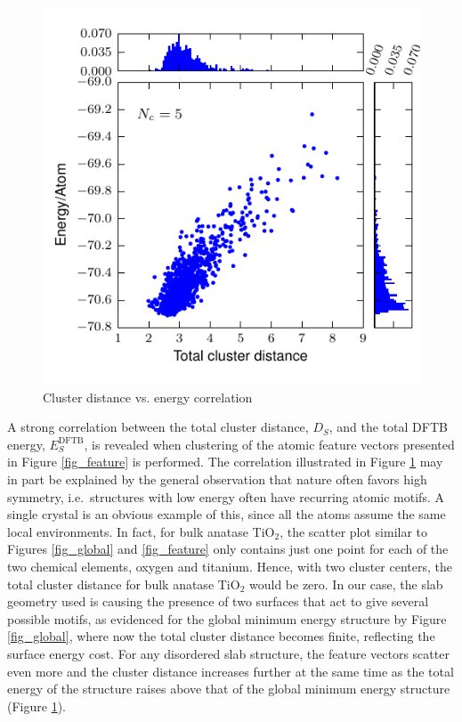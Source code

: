 \documentclass[aip,amsmath,amssymb,reprint]{revtex4-1}
\begin{document}
\begin{figure}[tb]
    \centering
    \includegraphics[width=1.0\columnwidth]{fig4-correlation.pdf}
    \caption{Cluster distance vs. energy correlation}
    \label{fig_corr}
\end{figure}

A strong correlation between the total
cluster distance, $D_S$, and the total DFTB energy,
$E_S^\mathrm{DFTB}$, is revealed when
clustering of the atomic feature vectors presented in
Figure \ref{fig_feature} is performed. The correlation illustrated in
Figure \ref{fig_corr} may in part be explained by the
general observation that nature often favors high
symmetry\cite{Pikard2011}, i.e.\ structures with low energy often have
recurring atomic motifs. A single crystal is an obvious example of
this, since all the atoms assume the same local
environments. In fact, for bulk anatase TiO$_2$, the scatter plot similar to
Figures \ref{fig_global} and \ref{fig_feature} only contains just one point
for each of the two chemical elements, oxygen and titanium. Hence, with
two cluster centers, the total cluster distance for bulk anatase TiO$_2$ would be zero. In our
case, the slab geometry used is causing the presence of two surfaces
that act to give several possible motifs, as evidenced for the global
minimum energy structure by Figure \ref{fig_global}, where now the total cluster
distance becomes finite, reflecting the surface energy cost. For any
disordered slab structure, the feature vectors scatter even more and the cluster distance increases
further at the same time as the total energy of the structure
raises above that of the global minimum energy structure (Figure \ref{fig_corr}).
\end{document}
